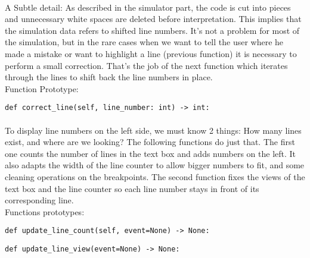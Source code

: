 \documentclass{article}
\begin{document}
\paragraph{}

A Subtle detail: As described in the simulator part, the code is cut into pieces and unnecessary white spaces are deleted before interpretation. This implies that the simulation data refers to shifted line numbers. It's not a problem for most of the simulation, but in the rare cases when we want to tell the user where he made a mistake or want to highlight a line (previous function) it is necessary to perform a small correction. That's the job of the next function which iterates through the lines to shift back the line numbers in place. \\
Function Prototype: \\

\begin{lstlisting}[language=MyPython]
def correct_line(self, line_number: int) -> int:
\end{lstlisting}
\paragraph{}

To display line numbers on the left side, we must know 2 things: How many lines exist, and where are we looking? The following functions do just that. The first one counts the number of lines in the text box and adds numbers on the left. It also adapts the width of the line counter to allow bigger numbers to fit, and some cleaning operations on the breakpoints. The second function fixes the views of the text box and the line counter so each line number stays in front of its corresponding line. \\
Functions prototypes: \\

\begin{lstlisting}[language=MyPython]
def update_line_count(self, event=None) -> None:
\end{lstlisting}
\begin{lstlisting}[language=MyPython]
def update_line_view(event=None) -> None:
\end{lstlisting}
\paragraph{}
\end{document}
